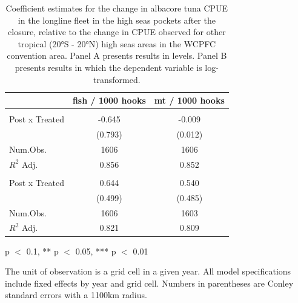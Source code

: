 \begin{table}
\centering
\begin{threeparttable}
\small
\caption{\label{tab:h2_reg_alb}Coefficient estimates for the change in albacore
             tuna CPUE in the longline fleet in the high seas pockets after
             the closure, relative to the change in CPUE observed for other tropical
             (20°S - 20°N) high seas areas in the WCPFC convention area.
             Panel A presents results in levels. Panel B presents results in
             which the dependent variable is log-transformed.}
\centering
\begin{tabular}[t]{lcc}
\toprule
  & fish / 1000 hooks & mt / 1000 hooks\\
\midrule
\addlinespace[0.5em]
\multicolumn{3}{l}{\textit{A) Levels}}\\
\midrule \hspace{1em}Post x Treated & -0.645 & -0.009\\
\hspace{1em} & (0.793) & (0.012)\\
\hspace{1em}Num.Obs. & 1606 & 1606\\
\hspace{1em}$R^2$ Adj. & 0.856 & 0.852\\
\addlinespace[0.5em]
\multicolumn{3}{l}{\textit{B) Log-transformed}}\\
\midrule \hspace{1em}Post x Treated & 0.644 & 0.540\\
\hspace{1em} & (0.499) & (0.485)\\
\hspace{1em}Num.Obs. & 1606 & 1603\\
\hspace{1em}$R^2$ Adj. & 0.821 & 0.809\\
\bottomrule
\end{tabular}
\begin{tablenotes}
\small
\item * p $<$ 0.1, ** p $<$ 0.05, *** p $<$ 0.01
\item The unit of observation is a grid cell in a given year. All model specifications include fixed effects by year and grid cell. Numbers in parentheses are Conley standard errors with a 1100km radius.
\end{tablenotes}
\end{threeparttable}
\end{table}
